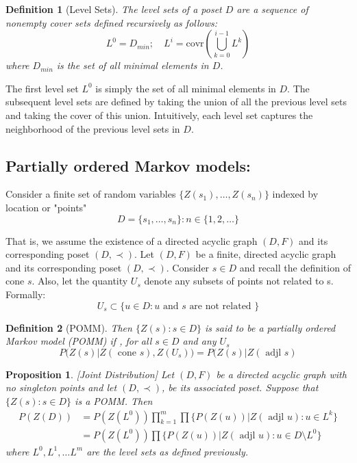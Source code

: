 \documentclass[11pt]{amsart}
\newtheorem{proposition}{Proposition}
\newtheorem{definition}{Definition}
\begin{document}
\begin{definition}[Level Sets]
The level sets of a poset $D$ are a sequence of nonempty cover sets defined recursively as follows:
\begin{equation}
L^0 = D_{min};\quad L^i = \text{covr}\left( \bigcup_{k=0}^{i-1} L^k \right) \nonumber
\end{equation}
where $D_{min}$ is the set of all minimal elements in $D$.
\end{definition}

The first level set $L^0$ is simply the set of all minimal elements in $D$. The subsequent level sets are defined by taking the union of all the previous level sets and taking the cover of this union. Intuitively, each level set captures the neighborhood of the previous level sets in $D$.



\subsection{Partially ordered Markov models:}

Consider a finite set of random variables $\{ Z(s_1),\ldots,Z(s_n) \}$ indexed by location or "points" $$
D = \{s_1,\ldots ,s_n \}: n \in \{1,2,\ldots \}
$$

That is, we assume the existence of a directed acyclic graph $(D,F)$ and its corresponding poset $(D,\prec).$
Let $(D,F)$ be a finite, directed acyclic graph and its corresponding poset $(D,\prec).$ Consider $s \in D$ and recall the definition of cone $s$. Also, let the quantity $U_s$ denote any subsets of points not related to s. 
Formally:
$$
U_s \subset \{ u \in D: u \text{ and } s \text{ are not related } \}
$$
\begin{definition}[POMM]
Then $\{ Z(s): s \in D \}$ is said to be a partially ordered Markov model (POMM) if , for all $s \in D$ and any $U_s$
\begin{equation}
P(Z(s)|Z(\text{ cone } s), Z(U_s)) = P(Z(s)|Z(\text{ adjl } s)
\end{equation}
\end{definition}
\begin{proposition}\label{eq:result1}[Joint Distribution]
Let $(D,F)$ be a directed acyclic graph with no singleton points and let $(D, \prec)$, be its associated poset. Suppose that $\{Z(s): s \in D\}$ is a POMM. Then 
\begin{align}
P(Z(D)) &= P(Z(L^0)) \prod_{k=1}^m \prod \{ P(Z(u))| Z(\text{ adjl } u): u \in L^k \} \\
&= P(Z(L^0)) \prod \{ P(Z(u))| Z(\text{ adjl } u): u \in D 
\setminus L^0 \}
\end{align}
where $L^0, L^1, \ldots L^m$ are the level sets as defined previously.
\end{proposition}
\end{document}
